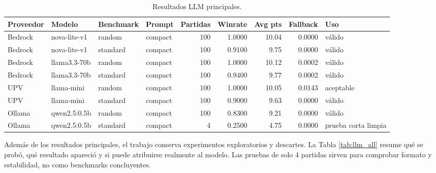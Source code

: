 ﻿\documentclass[10pt,a4paper]{article}
\begin{document}
\begin{table}[H]
\centering
\scriptsize
\begin{tabular}{llllrrrrl}
\toprule
Proveedor & Modelo & Benchmark & Prompt & Partidas & Winrate & Avg pts & Fallback & Uso \\
\midrule
Bedrock & nova-lite-v1 & random & compact & 100 & 1.0000 & 10.04 & 0.0000 & válido \\
Bedrock & nova-lite-v1 & standard & compact & 100 & 0.9100 & 9.75 & 0.0000 & válido \\
Bedrock & llama3.3-70b & random & compact & 100 & 1.0000 & 10.12 & 0.0002 & válido \\
Bedrock & llama3.3-70b & standard & compact & 100 & 0.9400 & 9.77 & 0.0002 & válido \\
UPV & llama-mini & random & compact & 100 & 1.0000 & 10.05 & 0.0143 & aceptable \\
UPV & llama-mini & standard & compact & 100 & 0.9000 & 9.63 & 0.0000 & válido \\
Ollama & qwen2.5:0.5b & random & compact & 100 & 0.8300 & 9.21 & 0.0000 & válido \\
Ollama & qwen2.5:0.5b & standard & compact & 4 & 0.2500 & 4.75 & 0.0000 & prueba corta limpia \\
\bottomrule
\end{tabular}
\caption{Resultados LLM principales.}
\label{tab:llm}
\end{table}

Además de los resultados principales, el trabajo conserva experimentos exploratorios y descartes. La Tabla \ref{tab:llm_all} resume qué se probó, qué resultado apareció y si puede atribuirse realmente al modelo. Las pruebas de solo 4 partidas sirven para comprobar formato y estabilidad, no como benchmarks concluyentes.
\end{document}
